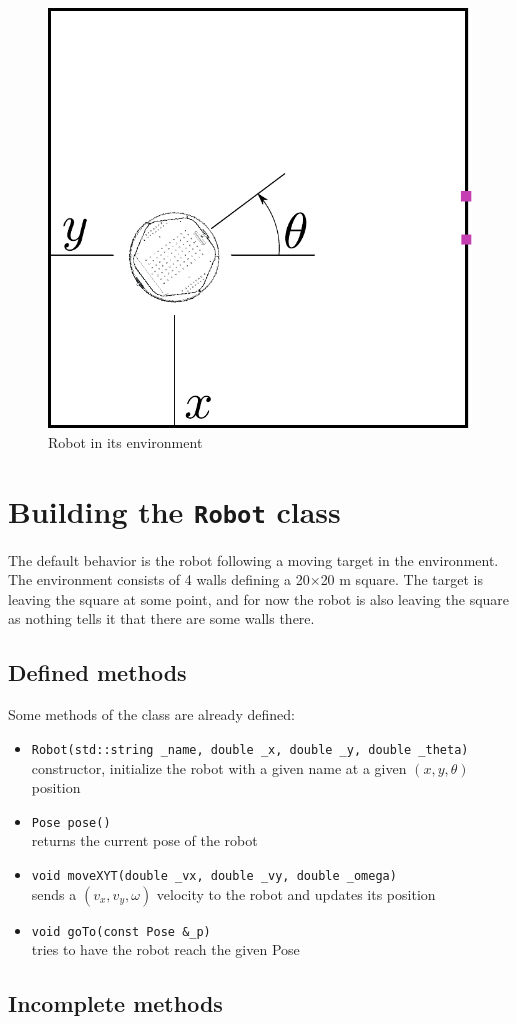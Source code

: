 \documentclass{ecnreport}
\begin{document}
\newpage

\begin{figure}\centering
\includegraphics[width=.3\linewidth]{environment}
\caption{\label{fig:envir} Robot in its environment}
\end{figure}


\section{Building the \texttt{Robot} class}

The default behavior is the robot following a moving target in the environment. The environment consists of 4 walls defining a 20$\times$20 m square. The target is leaving the square at some point, 
and for now the robot is also leaving the square as nothing tells it that there are some walls there.

\subsection{Defined methods}

Some methods of the class are already defined:
\begin{itemize}
 \item \texttt{Robot(std::string \_name, double \_x, double \_y, double \_theta)}\\
 constructor, initialize the robot with a given name at a given $(x,y,\theta)$ position
 \item \texttt{Pose pose()} \\ returns the current pose of the robot
 \item \texttt{void moveXYT(double \_vx, double \_vy, double \_omega)}\\
 sends a $(v_x, v_y, \omega)$ velocity to the robot and updates its position
 \item \texttt{void goTo(const Pose \&\_p)}\\
 tries to have the robot reach the given Pose
\end{itemize}


\subsection{Incomplete methods}
\end{document}
